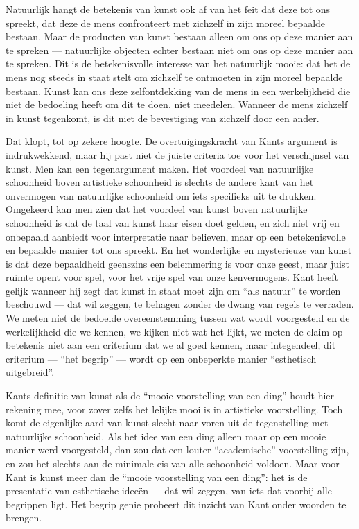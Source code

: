 Natuurlijk hangt de betekenis van kunst ook af van het feit dat deze tot ons spreekt, dat deze de mens confronteert met zichzelf in zijn moreel bepaalde bestaan. Maar de producten van kunst bestaan alleen om ons op deze manier aan te spreken — natuurlijke objecten echter bestaan niet om ons op deze manier aan te spreken. Dit is de betekenisvolle interesse van het natuurlijk mooie: dat het de mens nog steeds in staat stelt om zichzelf te ontmoeten in zijn moreel bepaalde bestaan. Kunst kan ons deze zelfontdekking van de mens in een werkelijkheid die niet de bedoeling heeft om dit te doen, niet meedelen. Wanneer de mens zichzelf in kunst tegenkomt, is dit niet de bevestiging van zichzelf door een ander.

Dat klopt, tot op zekere hoogte. De overtuigingskracht van Kants argument is indrukwekkend, maar hij past niet de juiste criteria toe voor het verschijnsel van kunst. Men kan een tegenargument maken. Het voordeel van natuurlijke schoonheid boven artistieke schoonheid is slechts de andere kant van het onvermogen van natuurlijke schoonheid om iets specifieks uit te drukken. Omgekeerd kan men zien dat het voordeel van kunst boven natuurlijke schoonheid is dat de taal van kunst haar eisen doet gelden, en zich niet vrij en onbepaald aanbiedt voor interpretatie naar believen, maar op een betekenisvolle en bepaalde manier tot ons spreekt. En het wonderlijke en mysterieuze van kunst is dat deze bepaaldheid geenszins een belemmering is voor onze geest, maar juist ruimte opent voor spel, voor het vrije spel van onze kenvermogens. Kant heeft gelijk wanneer hij zegt dat kunst in staat moet zijn om ``als natuur'' te worden beschouwd — dat wil zeggen, te behagen zonder de dwang van regels te verraden. We meten niet de bedoelde overeenstemming tussen wat wordt voorgesteld en de werkelijkheid die we kennen, we kijken niet wat het lijkt, we meten de claim op betekenis niet aan een criterium dat we al goed kennen, maar integendeel, dit criterium — ``het begrip'' — wordt op een onbeperkte manier ``esthetisch uitgebreid''.

Kants definitie van kunst als de ``mooie voorstelling van een ding'' houdt hier rekening mee, voor zover zelfs het lelijke mooi is in artistieke voorstelling. Toch komt de eigenlijke aard van kunst slecht naar voren uit de tegenstelling met natuurlijke schoonheid. Als het idee van een ding alleen maar op een mooie manier werd voorgesteld, dan zou dat een louter ``academische'' voorstelling zijn, en zou het slechts aan de minimale eis van alle schoonheid voldoen. Maar voor Kant is kunst meer dan de ``mooie voorstelling van een ding'': het is de presentatie van esthetische ideeën — dat wil zeggen, van iets dat voorbij alle begrippen ligt. Het begrip genie probeert dit inzicht van Kant onder woorden te brengen.


